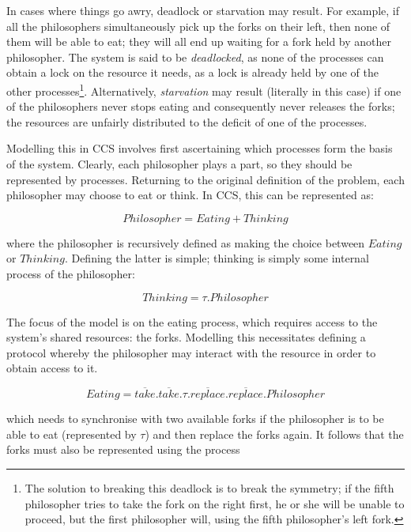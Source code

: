 In cases where things go awry, deadlock or starvation may result.  For
example, if all the philosophers simultaneously pick up the forks on
their left, then none of them will be able to eat; they will all end
up waiting for a fork held by another philosopher.  The system is said
to be \emph{deadlocked}, as none of the processes can obtain a lock on
the resource it needs, as a lock is already held by one of the other
processes\footnote{The solution to breaking this deadlock is to break
  the symmetry; if the fifth philosopher tries to take the fork on the
  right first, he or she will be unable to proceed, but the first
  philosopher will, using the fifth philosopher's left fork.}.
Alternatively, \emph{starvation} may result (literally in this case)
if one of the philosophers never stops eating and consequently never
releases the forks; the resources are unfairly distributed to the
deficit of one of the processes.

Modelling this in CCS involves first ascertaining which processes form
the basis of the system.  Clearly, each philosopher plays a part, so
they should be represented by processes.  Returning to the original
definition of the problem, each philosopher may choose to eat or
think.  In CCS, this can be represented as:

\begin{equation}
Philosopher = Eating + Thinking
\end{equation}

\noindent where the philosopher is recursively defined as making the
choice between $Eating$ or $Thinking$.  Defining the latter is simple;
thinking is simply some internal process of the philosopher:

\begin{equation}
Thinking = \tau .Philosopher
\end{equation}

The focus of the model is on the eating process, which requires access
to the system's shared resources: the forks.  Modelling this
necessitates defining a protocol whereby the philosopher may interact
with the resource in order to obtain access to it.  

\begin{equation}
Eating = \overline{take}.\overline{take}.\tau.\overline{replace}.\overline{replace}.Philosopher
\end{equation}

\noindent which needs to synchronise with two available forks if the
philosopher is to be able to eat (represented by $\tau$) and then
replace the forks again.  It follows that the forks must also be
represented using the process

